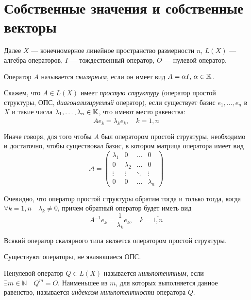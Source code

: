 \section{Собственные значения и собственные векторы}
Далее $X$ — конечномерное линейное пространство размерности $n$, $L(X)$ —
алгебра операторов, $I$ — тождественный оператор, $O$ — нулевой оператор.

\begin{definition}
    Оператор $A$ называется \emph{скалярным}, если он имеет вид $A = \alpha I, \,
    \alpha \in \mathbb{K}$.
\end{definition}

\begin{definition}\label{def:diagonalizable}
    Скажем, что $A\in L(X)$ имеет \emph{простую структуру} (оператор простой структуры,
    ОПС, \emph{диагонализируемый} оператор), если существует базис $e_1,
    \dotsc, e_n$ в $X$ и такие числа $\lambda_1, \dotsc, \lambda_n \in
    \mathbb{K}$, что имеют место равенства:
    \[ Ae_k = \lambda_k e_k, \quad k = \overline{1,n} \]
\end{definition}

Иначе говоря, для того чтобы $A$ был оператором простой структуры, необходимо и
достаточно, чтобы существовал базис, в котором матрица оператора имеет вид
\[ \mathcal{A} = \begin{pmatrix}
        \lambda_1 & 0 & \ldots & 0 \\
        0 & \lambda_2 & \ldots & 0 \\
        \vdots & \vdots & \ddots & \vdots \\
        0 & 0 & \ldots & \lambda_n
\end{pmatrix} \]

Очевидно, что оператор простой структуры обратим тогда и только тогда, когда $
\forall k = \overline{1,n} \quad \lambda_k \neq 0 $, причем обратный оператор будет
иметь вид
\[ A^{-1} e_k = \frac{1}{\lambda_k} e_k, \quad k = \overline{1,n} \]

Всякий оператор скалярного типа является оператором простой структуры.

Существуют операторы, не являющиеся ОПС.

\begin{definition}
    Ненулевой оператор $ Q \in L(X) $ называется \emph{нильпотентным}, если
    $\exists m \in \mathbb{N} \quad Q^m = O$. Наименьшее из $m$, для которых
    выполняется данное равенство, называется \emph{индексом нильпотентности}
    оператора $Q$.
\end{definition}

